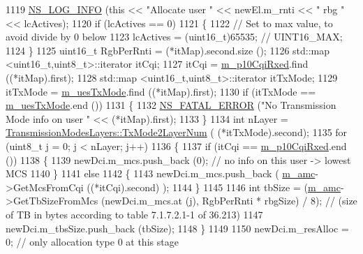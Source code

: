 \begin{DoxyCode}
1119       \hyperlink{group__logging_gafbd73ee2cf9f26b319f49086d8e860fb}{NS\_LOG\_INFO} (\textcolor{keyword}{this} << \textcolor{stringliteral}{"Allocate user "} << newEl.m\_rnti << \textcolor{stringliteral}{" rbg "} << lcActives);
1120       \textcolor{keywordflow}{if} (lcActives == 0)
1121         \{
1122           \textcolor{comment}{// Set to max value, to avoid divide by 0 below}
1123           lcActives = (uint16\_t)65535; \textcolor{comment}{// UINT16\_MAX;}
1124         \}
1125       uint16\_t RgbPerRnti = (*itMap).second.size ();
1126       std::map <uint16\_t,uint8\_t>::iterator itCqi;
1127       itCqi = \hyperlink{classns3_1_1TdMtFfMacScheduler_a4b524ffee6b93f0534a603937fd30cb1}{m\_p10CqiRxed}.find ((*itMap).first);
1128       std::map <uint16\_t,uint8\_t>::iterator itTxMode;
1129       itTxMode = \hyperlink{classns3_1_1TdMtFfMacScheduler_a4e8f3faab7130fbcbfa6df2bf09a7a9a}{m\_uesTxMode}.find ((*itMap).first);
1130       \textcolor{keywordflow}{if} (itTxMode == \hyperlink{classns3_1_1TdMtFfMacScheduler_a4e8f3faab7130fbcbfa6df2bf09a7a9a}{m\_uesTxMode}.end ())
1131         \{
1132           \hyperlink{group__fatal_ga5131d5e3f75d7d4cbfd706ac456fdc85}{NS\_FATAL\_ERROR} (\textcolor{stringliteral}{"No Transmission Mode info on user "} << (*itMap).first);
1133         \}
1134       \textcolor{keywordtype}{int} nLayer = \hyperlink{classns3_1_1TransmissionModesLayers_a31f608b7bfaa77440fe4cb85ad035329}{TransmissionModesLayers::TxMode2LayerNum} (
      (*itTxMode).second);
1135       \textcolor{keywordflow}{for} (uint8\_t j = 0; j < nLayer; j++)
1136         \{
1137           \textcolor{keywordflow}{if} (itCqi == \hyperlink{classns3_1_1TdMtFfMacScheduler_a4b524ffee6b93f0534a603937fd30cb1}{m\_p10CqiRxed}.end ())
1138             \{
1139               newDci.m\_mcs.push\_back (0); \textcolor{comment}{// no info on this user -> lowest MCS}
1140             \}
1141           \textcolor{keywordflow}{else}
1142             \{
1143               newDci.m\_mcs.push\_back ( \hyperlink{classns3_1_1TdMtFfMacScheduler_a2fa1c7abd867e10a52fcd0de82dc6cc1}{m\_amc}->GetMcsFromCqi ((*itCqi).second) );
1144             \}
1145 
1146           \textcolor{keywordtype}{int} tbSize = (\hyperlink{classns3_1_1TdMtFfMacScheduler_a2fa1c7abd867e10a52fcd0de82dc6cc1}{m\_amc}->GetTbSizeFromMcs (newDci.m\_mcs.at (j), RgbPerRnti * rbgSize) / 8); \textcolor{comment}{//
       (size of TB in bytes according to table 7.1.7.2.1-1 of 36.213)}
1147           newDci.m\_tbsSize.push\_back (tbSize);
1148         \}
1149 
1150       newDci.m\_resAlloc = 0;  \textcolor{comment}{// only allocation type 0 at this stage}

\end{DoxyCode}
